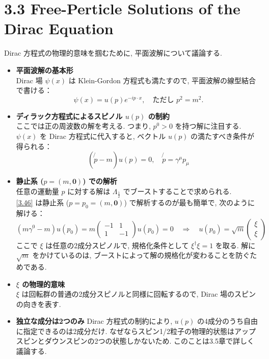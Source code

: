 \documentclass[a4paper,12pt]{article}
\begin{document}
\section*{3.3 Free-Perticle Solutions of the Dirac Equation}
 Dirac 方程式の物理的意味を掴むために, 平面波解について議論する.
\begin{itemize}
  \item \textbf{平面波解の基本形}\\
  Dirac 場 $\psi(x)$ は Klein-Gordon 方程式も満たすので, 平面波解の線型結合で書ける：
  \begin{equation*}
    \psi(x) = u(p) e^{-ip \cdot x}, \quad \text{ただし } p^2 = m^2. \tag{3.45}
\end{equation*}
  \item \textbf{ディラック方程式によるスピノル $u(p)$ の制約}\\ 
  ここでは正の周波数の解を考える. つまり, $p^0 > 0$ を持つ解に注目する. $\psi(x)$ を Dirac 方程式に代入すると, ベクトル $u(p)$ の満たすべき条件が得られる：
  \begin{equation*}
    (\not{p} - m) u(p) = 0, \quad \not{p} = \gamma^\mu p_\mu \label{3.46}\tag{3.46}
  \end{equation*}

  \item \textbf{静止系 ($p = (m, \mathbf{0})$) での解析}\\
  任意の運動量 $p$ に対する解は $\Lambda_{\frac{1}{2}}$ でブーストすることで求められる.\\
  \eqref{3.46} は静止系 ($p = p_0 = (m, \mathbf{0}) $) で解析するのが最も簡単で, 次のように解ける：
  \begin{equation*}
    (m \gamma^0 - m) u(p_0) = m \begin{pmatrix}
      -1 & 1 \\
      1 & -1
    \end{pmatrix} u(p_0) = 0 \quad \Rightarrow \quad
    u(p_0) = \sqrt{m}
    \begin{pmatrix}
    \xi \\
    \xi
    \end{pmatrix} \tag{3.47}
  \end{equation*}
  ここで $\xi$ は任意の2成分スピノルで, 規格化条件として $\xi^\dagger \xi = 1$ を取る. 解に $\sqrt{m}$ をかけているのは, ブーストによって解の規格化が変わることを防ぐためである.
  \item \textbf{$\xi$ の物理的意味}\\
  $\xi$ は回転群の普通の2成分スピノルと同様に回転するので, Dirac 場のスピンの向きを表す.
  \item \textbf{独立な成分は2つのみ}  
  Dirac 方程式の制約により, $u(p)$ の4成分のうち自由に指定できるのは2成分だけ. なぜならスピン1/2粒子の物理的状態はアップスピンとダウンスピンの2つの状態しかないため. このことは3.5章で詳しく議論する.


\end{itemize}
\end{document}

